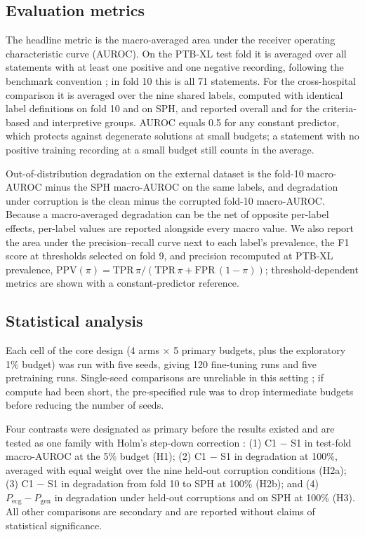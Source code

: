 \documentclass[preprint,12pt]{elsarticle}
\begin{document}
\subsection{Evaluation metrics}
\label{sec:metrics}

The headline metric is the macro-averaged area under the receiver operating characteristic curve (AUROC). On the PTB-XL test fold it is averaged over all statements with at least one positive and one negative recording, following the benchmark convention \cite{strodthoff2021}; in fold 10 this is all 71 statements. For the cross-hospital comparison it is averaged over the nine shared labels, computed with identical label definitions on fold 10 and on SPH, and reported overall and for the criteria-based and interpretive groups. AUROC equals 0.5 for any constant predictor, which protects against degenerate solutions at small budgets; a statement with no positive training recording at a small budget still counts in the average.

Out-of-distribution degradation on the external dataset is the fold-10 macro-AUROC minus the SPH macro-AUROC on the same labels, and degradation under corruption is the clean minus the corrupted fold-10 macro-AUROC. Because a macro-averaged degradation can be the net of opposite per-label effects, per-label values are reported alongside every macro value. We also report the area under the precision--recall curve next to each label's prevalence, the F1 score at thresholds selected on fold 9, and precision recomputed at PTB-XL prevalence, $\mathrm{PPV}(\pi) = \mathrm{TPR}\,\pi / (\mathrm{TPR}\,\pi + \mathrm{FPR}\,(1-\pi))$; threshold-dependent metrics are shown with a constant-predictor reference.

\subsection{Statistical analysis}
\label{sec:stats}

Each cell of the core design (4 arms $\times$ 5 primary budgets, plus the exploratory 1\% budget) was run with five seeds, giving 120 fine-tuning runs and five pretraining runs. Single-seed comparisons are unreliable in this setting \cite{bouthillier2021,ahmed2026}; if compute had been short, the pre-specified rule was to drop intermediate budgets before reducing the number of seeds.

Four contrasts were designated as primary before the results existed and are tested as one family with Holm's step-down correction \cite{holm1979}: (1) C1 $-$ S1 in test-fold macro-AUROC at the 5\% budget (H1); (2) C1 $-$ S1 in degradation at 100\%, averaged with equal weight over the nine held-out corruption conditions (H2a); (3) C1 $-$ S1 in degradation from fold 10 to SPH at 100\% (H2b); and (4) $P_{\text{ecg}} - P_{\text{gen}}$ in degradation under held-out corruptions and on SPH at 100\% (H3). All other comparisons are secondary and are reported without claims of statistical significance.
\end{document}
